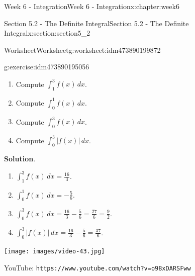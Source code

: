 \documentclass[oneside,10pt,]{book}
\newcommand{\blocktitlefont}{\relax}
\newcommand{\mono}[1]{\texttt{#1}}
\numberwithin{equation}{section}
\newlength{\qrsize}
\newlength{\previewwidth}
\begin{document}
\begin{chapterptx}{Week 6 - Integration}{}{Week 6 - Integration}{}{}{x:chapter:week6}
\begin{sectionptx}{Section 5.2 - The Definite Integral}{}{Section 5.2 - The Definite Integral}{}{}{x:section:section5_2}
\begin{worksheet-subsection}{Worksheet}{}{Worksheet}{}{}{g:worksheet:idm473890199872}
\begin{divisionexercise}{2}{}{}{g:exercise:idm473890195056}
\begin{image}{0}{1}{0}
\end{image}%
%
\begin{enumerate}[label=(\alph*)]
\item{}Compute \(\displaystyle \int_1^3 f(x)\, dx\).%
\item{}Compute \(\displaystyle \int_0^1 f(x)\, dx\).%
\item{}Compute \(\displaystyle \int_0^3 f(x)\, dx\).%
\item{}Compute \(\displaystyle \int_0^3 \vert f(x)\vert \, dx\).%
\end{enumerate}
\textbf{\blocktitlefont Solution}.\hypertarget{g:solution:idm473890190592}{}\quad{}%
\begin{enumerate}[label=(\alph*)]
\item{}\(\displaystyle \int_1^3 f(x)\, dx = \frac{16}{3}\).%
\item{}\(\displaystyle \int_0^1 f(x)\, dx = -\frac 56\).%
\item{}\(\displaystyle \int_0^3 f(x)\, dx = \frac{16}{3}-\frac 56 = \frac{27}{6} = \frac 92\).%
\item{}\(\displaystyle \int_0^3 \vert f(x)\vert \, dx= \frac{16}{3}-\frac 56 = \frac{37}{6}\).%
\end{enumerate}
\end{divisionexercise}%
\end{worksheet-subsection}
\restoregeometry
\setlength{\qrsize}{9em}
\setlength{\previewwidth}{\linewidth}
\addtolength{\previewwidth}{-\qrsize}
\begin{tcbraster}[raster columns=2, raster column skip=1pt, raster halign=center, raster force size=false, raster left skip=0pt, raster right skip=0pt]%
\begin{tcolorbox}[previewstyle, width=\previewwidth]%
\texttt{[image: images/video-43.jpg]}%
\end{tcolorbox}%
\begin{tcolorbox}[qrstyle]%
{\hypersetup{urlcolor=black}}%
\end{tcolorbox}%
\begin{tcolorbox}[captionstyle]%
\small YouTube: \mono{https://www.youtube.com/watch?v=o98xDARSFww}\end{tcolorbox}%
\end{tcbraster}%
\end{sectionptx}
%
%
\typeout{************************************************}
\typeout{************************************************}
%

\end{chapterptx}
\end{document}
